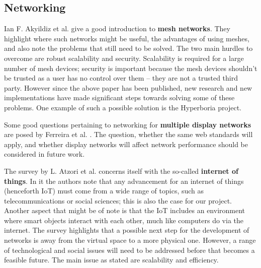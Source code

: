 \subsection{Networking}

Ian F. Akyildiz et al. \cite{akyildiz2005survey} give a good introduction to \textbf{mesh networks}.
They highlight where such networks might be useful, the advantages of using meshes, and also note the problems that still need to be solved.
The two main hurdles to overcome are robust scalability and security.
Scalability is required for a large number of mesh devices; security is important because the mesh devices shouldn't be trusted as a user has no control over them – they are not a trusted third party.
However since the above paper has been published, new research and new implementations have made significant steps towards solving some of these problems.
One example of such a possible solution is the Hyperboria \cite{hyperboria} project.

Some good questions pertaining to networking for \textbf{multiple display networks} are posed by Ferreira et al. \cite{ferreira2012scalability}.
The question, whether the same web standards will apply, and whether display networks will affect network performance should be considered in future work.

The survey by L. Atzori et al. \cite{atzori2010internet} concerns itself with the so-called \textbf{internet of things}.
In it the authors note that any advancement for an internet of things (henceforth IoT) must come from a wide range of topics, such as telecommunications or social sciences; this is also the case for our project.
Another aspect that might be of note is that the IoT includes an environment where smart objects interact with each other, much like computers do via the internet.
The survey highlights that a possible next step for the development of networks is away from the virtual space to a more physical one.
However, a range of technological and social issues will need to be addressed before that becomes a feasible future.
The main issue as stated are scalability and efficiency.
